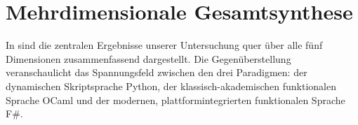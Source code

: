 \section{Mehrdimensionale Gesamtsynthese}
\label{sec:recommendation_matrix}

In  sind die zentralen Ergebnisse unserer Untersuchung quer über alle fünf Dimensionen zusammenfassend dargestellt.
Die Gegenüberstellung veranschaulicht das Spannungsfeld zwischen den drei Paradigmen: der dynamischen Skriptsprache Python, der klassisch-akademischen funktionalen Sprache OCaml und der modernen, plattformintegrierten funktionalen Sprache F\#.

